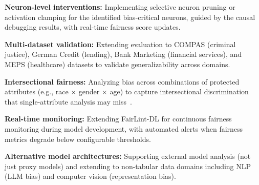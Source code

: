 \textbf{Neuron-level interventions:} Implementing selective neuron pruning or activation clamping for the identified bias-critical neurons, guided by the causal debugging results, with real-time fairness score updates.

\textbf{Multi-dataset validation:} Extending evaluation to COMPAS (criminal justice), German Credit (lending), Bank Marketing (financial services), and MEPS (healthcare) datasets to validate generalizability across domains.

\textbf{Intersectional fairness:} Analyzing bias across combinations of protected attributes (e.g., race $\times$ gender $\times$ age) to capture intersectional discrimination that single-attribute analysis may miss~\cite{barocas-hardt-narayanan}.

\textbf{Real-time monitoring:} Extending FairLint-DL for continuous fairness monitoring during model development, with automated alerts when fairness metrics degrade below configurable thresholds.

\textbf{Alternative model architectures:} Supporting external model analysis (not just proxy models) and extending to non-tabular data domains including NLP (LLM bias) and computer vision (representation bias).
